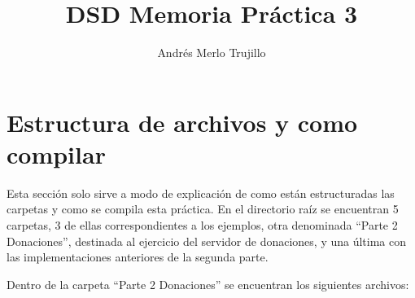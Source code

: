 \documentclass{article}
\title{DSD Memoria Práctica 3}
\author{Andrés Merlo Trujillo}
\date{}
\begin{document}
\maketitle

\tableofcontents

\newpage

\section{Estructura de archivos y como compilar}
Esta sección solo sirve a modo de explicación de como están estructuradas las carpetas y como se compila esta práctica. En el directorio raíz se encuentran 5 carpetas, 3 de ellas correspondientes a los ejemplos, otra denominada ``Parte 2 Donaciones'', destinada al ejercicio del servidor de donaciones, y una última con las implementaciones anteriores de la segunda parte.

\bigskip

Dentro de la carpeta ``Parte 2 Donaciones'' se encuentran los siguientes archivos:
\end{document}
